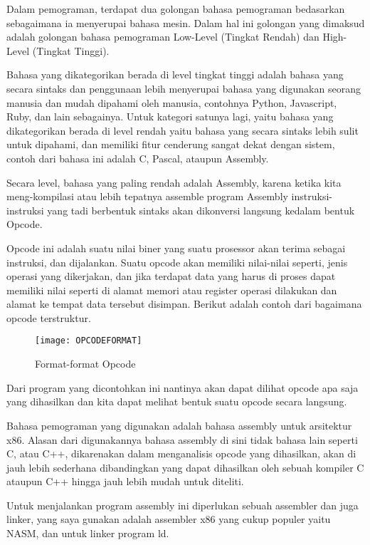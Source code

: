 \lstset{language=[x64]Assembler}

Dalam pemograman, terdapat dua golongan bahasa pemograman bedasarkan sebagaimana
ia menyerupai bahasa mesin. Dalam hal ini golongan yang dimaksud adalah golongan
bahasa pemograman Low-Level (Tingkat Rendah) dan High-Level (Tingkat Tinggi).

Bahasa yang dikategorikan berada di level tingkat tinggi adalah bahasa yang
secara sintaks dan penggunaan lebih menyerupai bahasa yang digunakan seorang
manusia dan mudah dipahami oleh manusia, contohnya Python, Javascript, Ruby,
dan lain sebagainya. Untuk kategori satunya lagi, yaitu bahasa yang dikategorikan
berada di level rendah yaitu bahasa yang secara sintaks lebih sulit untuk dipahami,
dan memiliki fitur cenderung sangat dekat dengan sistem, contoh dari bahasa ini
adalah C, Pascal, ataupun Assembly.

Secara level, bahasa yang paling rendah adalah Assembly, karena ketika kita
meng-kompilasi atau lebih tepatnya assemble program Assembly instruksi-instruksi
yang tadi berbentuk sintaks akan dikonversi langsung kedalam bentuk Opcode.

Opcode ini adalah suatu nilai biner yang suatu prosessor akan terima sebagai instruksi,
dan dijalankan. Suatu opcode akan memiliki nilai-nilai seperti, jenis operasi yang
dikerjakan, dan jika terdapat data yang harus di proses dapat memiliki nilai seperti
di alamat memori atau register operasi dilakukan dan alamat ke tempat data
tersebut disimpan. Berikut adalah contoh dari bagaimana opcode terstruktur.

\begin{figure}[h]
    \centering
    \texttt{[image: OPCODEFORMAT]}
    \caption{Format-format Opcode}
    \label{fig:OPCODEFORMAT}
\end{figure}

Dari program yang dicontohkan ini nantinya akan dapat dilihat opcode apa saja yang dihasilkan
dan kita dapat melihat bentuk suatu opcode secara langsung.

Bahasa pemograman yang digunakan adalah bahasa assembly untuk arsitektur x86. Alasan
dari digunakannya bahasa assembly di sini tidak bahasa lain seperti C, atau C++,
dikarenakan dalam menganalisis opcode yang dihasilkan, akan di jauh lebih sederhana
dibandingkan yang dapat dihasilkan oleh sebuah kompiler C ataupun C++ hingga jauh
lebih mudah untuk diteliti.

Untuk menjalankan program assembly ini diperlukan sebuah assembler dan juga linker,
yang saya gunakan adalah assembler x86 yang cukup populer yaitu NASM,
dan untuk linker program ld.

